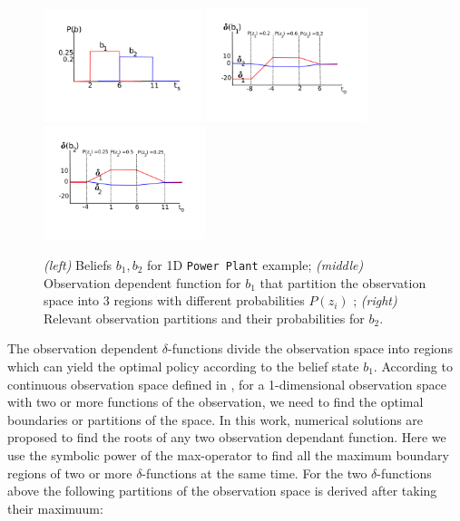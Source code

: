 \documentclass{article} %
\begin{document}
\begin{figure}[tbp!]
\vspace{-6mm}
\centering
\hspace{-17mm}
\includegraphics[width=0.41\textwidth]{pics/beliefs.pdf}
\hspace{-12mm}
\includegraphics[width=0.42\textwidth]{pics/delta1.pdf}
\hspace{-12mm}
\includegraphics[width=0.42\textwidth]{pics/delta2.pdf}
\hspace{-17mm}
\vspace{-10mm}
\caption{\footnotesize 
{\it (left)} Beliefs $b_1,b_2$ for 1D \texttt{Power Plant} example; 
{\it (middle)} Observation dependent function for $b_1$ that partition the observation space into 3 regions with different probabilities $P(z_i)$ ; 
{\it (right)} Relevant observation partitions and their probabilities for $b_2$.
}
\label{fig:timeSpace}
\vspace{-4mm}
\end{figure}
The observation dependent $\delta$-functions divide the observation space into regions which can yield the optimal policy according to the belief state $b_1$. According to continuous observation space defined in \cite{pascalPomdp}, for a 1-dimensional observation space with two or more functions of the observation, we need to find the optimal boundaries or partitions of the space. In this work, numerical solutions are proposed to find the roots of any two observation dependant function. Here we use the symbolic power of the max-operator to find all the maximum boundary regions of two or more $\delta$-functions at the same time. For the two $\delta$-functions above the following partitions of the observation space is derived after taking their maximuum: 
\end{document}
